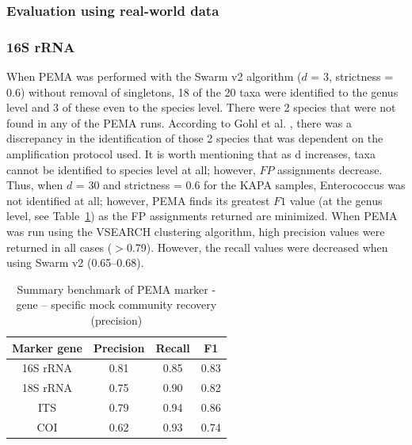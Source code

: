    \subsubsection{Evaluation using real-world data}
   \subsubsection*{16S rRNA}

      When PEMA was performed with the Swarm v2 algorithm ($d$ = 3, strictness = 0.6) without removal of singletons, 18 of the 20 taxa were identified to the genus level and 3 of these even to the species level. 
      There were 2 species that were not found in any of the PEMA runs. 
      According to Gohl et al. \citep{gohl2016systematic}, there was a discrepancy in the identification of those 2 species that was dependent on the amplification protocol used. 
      It is worth mentioning that as d increases, taxa cannot be identified to species level at all; 
      however, $FP$ assignments decrease. 
      Thus, when $d$ = 30 and strictness = 0.6 for the KAPA samples, Enterococcus was not identified at all; 
      however, PEMA finds its greatest $F1$ value (at the genus level, see Table~\ref{table:pema-precision}) as the FP assignments returned are minimized. 
      When PEMA was run using the VSEARCH clustering algorithm, high precision values were returned in all cases ($>$0.79). 
      However, the recall values were decreased when using Swarm v2 (0.65–0.68).

      \begin{table}
         \begin{center}
            \begin{tabular}{@{}cccc@{}}
               \toprule
               \multicolumn{1}{c}{\textbf{Marker gene}} & \multicolumn{1}{c}{\textbf{Precision}} & \multicolumn{1}{c}{\textbf{Recall}} & \multicolumn{1}{c}{\textbf{F1}} \\ \midrule
               16S rRNA & 0.81 & 0.85 & 0.83 \\
               18S rRNA & 0.75 & 0.90 & 0.82 \\
               ITS & 0.79 & 0.94 & 0.86 \\
               COI & 0.62 & 0.93 & 0.74
               \end{tabular}
               \caption[Summary benchmark of PEMA marker - gene - specific mock community recovery]{Summary benchmark of PEMA marker - gene – specific mock community recovery (precision)}
               \label{table:pema-precision}
         \end{center}
      \end{table}


